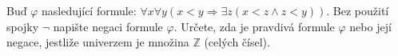 Buď $\varphi$ nasledující formule: $\forall x \forall y (x < y \Rightarrow
\exists z (x<z\wedge z<y))$. Bez použití
spojky $\neg$ napište negaci formule $\varphi$. Určete, zda je pravdivá formule
$\varphi$ nebo její
negace, jestliže univerzem je množina $\mathbb{Z}$ (celých čísel).
